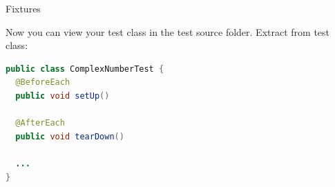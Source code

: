 \documentclass[11pt, xcolor=svgnames]{beamer}
\begin{document}









\begin{frame}[fragile]{Fixtures}

Now you can view your test class in the test source folder. Extract from test class:

\begin{center}
\begin{lstlisting}[language=Java,basicstyle=\scriptsize]
public class ComplexNumberTest {
  @BeforeEach
  public void setUp()

  @AfterEach
  public void tearDown()
  
  ...
}
\end{lstlisting}
\end{center}

\end{frame}
\end{document}
